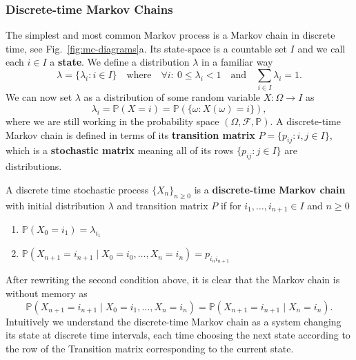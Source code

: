 \subsubsection{Discrete-time Markov Chains}
The simplest and most common Markov process is a Markov chain in discrete time, see Fig.~\ref{fig:mc-diagrams}a. Its state-space is a countable set $I$ and we call each $i \in I$ a \textbf{state}. We define a distribution $\lambda$ in a familiar way
\begin{equation}
	\lambda = \{\lambda_i : i \in I\} \quad \text{where} \quad \forall i:~ 0 \leq \lambda_i < 1 \quad \text{and} \quad \sum_{i \in I} \lambda_i = 1.
\end{equation}
We can now set $\lambda$ as a distribution of some random variable $X:\Omega \rightarrow I$ as
\begin{equation}
	\lambda_{i}=\mathbb{P}(X=i)=\mathbb{P}(\{\omega: X(\omega)=i\}),
\end{equation}
where we are still working in the probability space $(\Omega, \mathcal{F}, \mathbb{P})$. A discrete-time Markov chain is defined in terms of its \textbf{transition matrix} $P=\{p_{i j}: i, j \in I\}$, which is a \textbf{stochastic matrix} meaning all of its rows $\{p_{i j}: j \in I\}$ are distributions.
\begin{definition}
	A discrete time stochastic process $\{X_n\}_{n \geq 0}$ is a \textbf{discrete-time Markov chain} with initial distribution $\lambda$ and transition matrix $P$ if for $i_1, \dots, i_{n+1} \in I$ and $n \geq 0$
	\begin{enumerate}[label=\roman*)]
		\item $\mathbb{P}\left(X_{0}=i_{1}\right)=\lambda_{i_{1}}$
		\item $\mathbb{P}\left(X_{n+1}=i_{n+1} \mid X_{0}=i_{0}, \dots, X_{n}=i_{n}\right)=p_{i_{n} i_{n+1}}$
	\end{enumerate}
\end{definition}
After rewriting the second condition above, it is clear that the Markov chain is without memory as
\begin{equation}
	\mathbb{P}\left(X_{n+1}=i_{n+1} \mid X_{0}=i_{1}, \dots, X_{n}=i_{n}\right)=\mathbb{P}(X_{n+1} = i_{n+1} \mid X_{n} = i_{n}).
\end{equation}
Intuitively we understand the discrete-time Markov chain as a system changing its state at discrete time intervals, each time choosing the next state according to the row of the Transition matrix corresponding to the current state.
